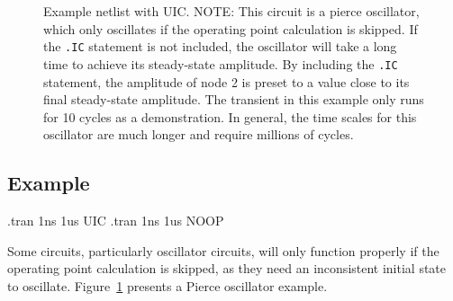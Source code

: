 \begin{figure}[htbp]
\begin{centering}
\caption[Example netlist with UIC.] {Example netlist with UIC. 
NOTE: This circuit is a pierce oscillator, which only oscillates if
the operating point calculation is skipped.  If the \texttt{.IC} statement is
not included, the oscillator will take a long time to achieve its
steady-state amplitude.  By including the \texttt{.IC} statement, the
amplitude of node 2 is preset to a value close to its final
steady-state amplitude.  The transient in this example only runs for
10 cycles as a demonstration.  In general, the time scales for this
oscillator are much longer and require millions of
cycles.  \label{UIC_Netlist}}
\end{centering}
\end{figure}

\subsection{Example}
\begin{vquote}
.tran 1ns 1us  UIC
.tran 1ns 1us  NOOP
\end{vquote}

Some circuits, particularly oscillator circuits, will only function properly if the operating point calculation
is skipped, as they need an inconsistent initial state to oscillate.  Figure~\ref{UIC_Netlist} presents a Pierce oscillator example.


